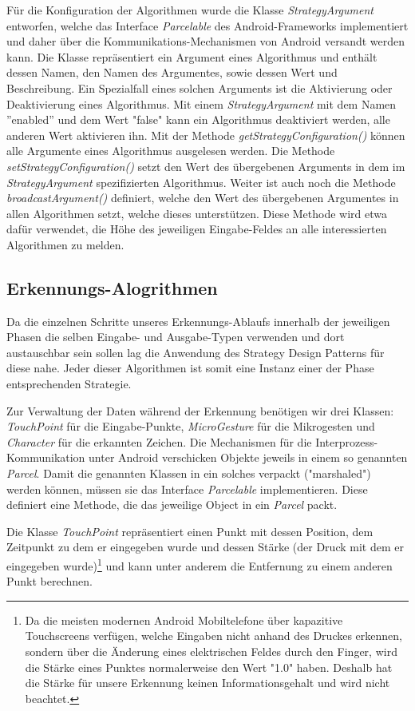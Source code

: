 \label{lbl_be_enable}Für die Konfiguration der Algorithmen wurde die Klasse \emph{StrategyArgument} entworfen, welche das Interface \emph{Parcelable} des Android-Frameworks implementiert und daher über die Kommunikations-Mechanismen von Android versandt werden kann. Die Klasse repräsentiert ein Argument eines Algorithmus und enthält dessen Namen, den Namen des Argumentes, sowie dessen Wert und Beschreibung. Ein Spezialfall eines solchen Arguments ist die Aktivierung oder Deaktivierung eines Algorithmus. Mit einem \emph{StrategyArgument} mit dem Namen ''enabled'' und dem Wert "false" kann ein Algorithmus deaktiviert werden, alle anderen Wert aktivieren ihn. Mit der Methode \emph{getStrategyConfiguration()} können alle Argumente eines Algorithmus ausgelesen werden. Die Methode \emph{setStrategyConfiguration()} setzt den Wert des übergebenen Arguments in dem im \emph{StrategyArgument} spezifizierten Algorithmus. Weiter ist auch noch die Methode \emph{broadcastArgument()} definiert, welche den Wert des übergebenen Argumentes in allen Algorithmen setzt, welche dieses unterstützen. Diese Methode wird etwa dafür verwendet, die Höhe des jeweiligen Eingabe-Feldes an alle interessierten Algorithmen zu melden.

\subsection{Erkennungs-Alogrithmen}

Da die einzelnen Schritte unseres Erkennungs-Ablaufs innerhalb der jeweiligen Phasen die selben Eingabe- und Ausgabe-Typen verwenden und dort austauschbar sein sollen lag die Anwendung des Strategy Design Patterns\cite[S.315-323]{designpatterns} für diese nahe. Jeder dieser Algorithmen ist somit eine Instanz einer der Phase entsprechenden Strategie.

Zur Verwaltung der Daten während der Erkennung benötigen wir drei Klassen: \emph{TouchPoint} für die Eingabe-Punkte, \emph{MicroGesture} für die Mikrogesten und \emph{Character} für die erkannten Zeichen. Die Mechanismen für die Interprozess-Kommunikation unter Android verschicken Objekte jeweils in einem so genannten \emph{Parcel}. Damit die genannten Klassen in ein solches verpackt ("marshaled") werden können, müssen sie das Interface \emph{Parcelable} implementieren. Diese definiert eine Methode, die das jeweilige Object in ein \emph{Parcel} packt.

Die Klasse \emph{TouchPoint} repräsentiert einen Punkt mit dessen Position, dem Zeitpunkt zu dem er eingegeben wurde und dessen Stärke (der Druck mit dem er eingegeben wurde)\footnote{Da die meisten modernen Android Mobiltelefone über kapazitive Touchscreens verfügen, welche Eingaben nicht anhand des Druckes erkennen, sondern über die Änderung eines elektrischen Feldes durch den Finger, wird die Stärke eines Punktes normalerweise den Wert "1.0" haben. Deshalb hat die Stärke für unsere Erkennung keinen Informationsgehalt und wird nicht beachtet.} und kann unter anderem die Entfernung zu einem anderen Punkt berechnen.

